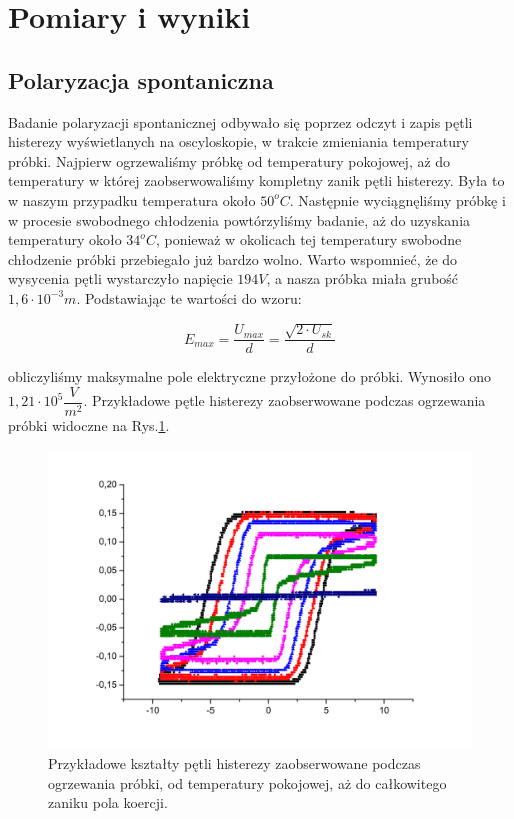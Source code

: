 \documentclass{article}
\begin{document}
\section{Pomiary i wyniki}
\subsection{Polaryzacja spontaniczna}

Badanie polaryzacji spontanicznej odbywało się poprzez odczyt i zapis pętli histerezy wyświetlanych na oscyloskopie, w trakcie zmieniania temperatury próbki. Najpierw ogrzewaliśmy próbkę od temperatury pokojowej, aż do temperatury w której zaobserwowaliśmy kompletny zanik pętli histerezy. Była to w naszym przypadku temperatura około $50^{o}C$. Następnie wyciągnęliśmy próbkę i w procesie swobodnego chłodzenia powtórzyliśmy badanie, aż do uzyskania temperatury około $34^{o}C$, ponieważ w okolicach tej temperatury swobodne chłodzenie próbki przebiegało już bardzo wolno. Warto wspomnieć, że do wysycenia pętli wystarczyło napięcie $194V$, a nasza próbka miała grubość $1,6\cdot10^{-3}m$. Podstawiając te wartości do wzoru:

\begin{equation}
E_{max}=\dfrac{U_{max}}{d}=\dfrac{\sqrt{2 \cdot U_{sk}}}{d}
\end{equation}

obliczyliśmy maksymalne pole elektryczne przyłożone do próbki. Wynosiło ono $1,21\cdot 10^{5} \dfrac{V}{m^{2}}$. Przykładowe pętle histerezy zaobserwowane podczas ogrzewania próbki widoczne na Rys.\ref{fig:Graph31}.

\begin{figure}[!h]
	\centering
	\includegraphics[width=0.8\linewidth]{Graph31.jpg}
	\caption{Przykładowe kształty pętli histerezy zaobserwowane podczas ogrzewania próbki, od temperatury pokojowej, aż do całkowitego zaniku pola koercji.}
	\label{fig:Graph31}
\end{figure}
\end{document}

